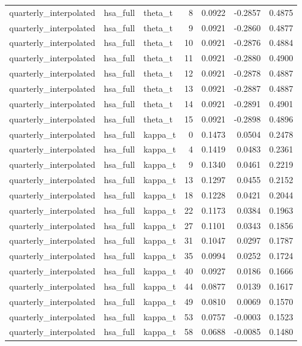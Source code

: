 \begin{tabular}{lllrrrr}
quarterly\_interpolated & hsa\_full & theta\_t & 8 & 0.0922 & -0.2857 & 0.4875 \\
quarterly\_interpolated & hsa\_full & theta\_t & 9 & 0.0921 & -0.2860 & 0.4877 \\
quarterly\_interpolated & hsa\_full & theta\_t & 10 & 0.0921 & -0.2876 & 0.4884 \\
quarterly\_interpolated & hsa\_full & theta\_t & 11 & 0.0921 & -0.2880 & 0.4900 \\
quarterly\_interpolated & hsa\_full & theta\_t & 12 & 0.0921 & -0.2878 & 0.4887 \\
quarterly\_interpolated & hsa\_full & theta\_t & 13 & 0.0921 & -0.2887 & 0.4887 \\
quarterly\_interpolated & hsa\_full & theta\_t & 14 & 0.0921 & -0.2891 & 0.4901 \\
quarterly\_interpolated & hsa\_full & theta\_t & 15 & 0.0921 & -0.2898 & 0.4896 \\
quarterly\_interpolated & hsa\_full & kappa\_t & 0 & 0.1473 & 0.0504 & 0.2478 \\
quarterly\_interpolated & hsa\_full & kappa\_t & 4 & 0.1419 & 0.0483 & 0.2361 \\
quarterly\_interpolated & hsa\_full & kappa\_t & 9 & 0.1340 & 0.0461 & 0.2219 \\
quarterly\_interpolated & hsa\_full & kappa\_t & 13 & 0.1297 & 0.0455 & 0.2152 \\
quarterly\_interpolated & hsa\_full & kappa\_t & 18 & 0.1228 & 0.0421 & 0.2044 \\
quarterly\_interpolated & hsa\_full & kappa\_t & 22 & 0.1173 & 0.0384 & 0.1963 \\
quarterly\_interpolated & hsa\_full & kappa\_t & 27 & 0.1101 & 0.0343 & 0.1856 \\
quarterly\_interpolated & hsa\_full & kappa\_t & 31 & 0.1047 & 0.0297 & 0.1787 \\
quarterly\_interpolated & hsa\_full & kappa\_t & 35 & 0.0994 & 0.0252 & 0.1724 \\
quarterly\_interpolated & hsa\_full & kappa\_t & 40 & 0.0927 & 0.0186 & 0.1666 \\
quarterly\_interpolated & hsa\_full & kappa\_t & 44 & 0.0877 & 0.0139 & 0.1617 \\
quarterly\_interpolated & hsa\_full & kappa\_t & 49 & 0.0810 & 0.0069 & 0.1570 \\
quarterly\_interpolated & hsa\_full & kappa\_t & 53 & 0.0757 & -0.0003 & 0.1523 \\
quarterly\_interpolated & hsa\_full & kappa\_t & 58 & 0.0688 & -0.0085 & 0.1480 \\

\end{tabular}
